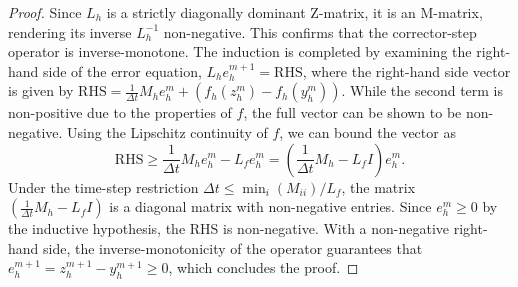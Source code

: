 \documentclass[pdflatex,sn-mathphys-num]{sn-jnl}%
\theoremstyle{thmstyleone}%
\numberwithin{equation}{section}
\begin{document}
\begin{proof}
Since $L_h$ is a strictly diagonally dominant Z-matrix, it is an M-matrix, rendering its inverse $L_h^{-1}$ non-negative. This confirms that the corrector-step operator is inverse-monotone. The induction is completed by examining the right-hand side of the error equation, $L_h e_h^{m+1} = \text{RHS}$, where the right-hand side vector is given by $\text{RHS} = \frac{1}{\Delta t} M_h e_h^m + (f_h(z_h^m) - f_h(y_h^m))$. While the second term is non-positive due to the properties of $f$, the full vector can be shown to be non-negative. Using the Lipschitz continuity of $f$, we can bound the vector as
$$ \text{RHS} \ge \frac{1}{\Delta t} M_h e_h^m - L_f e_h^m = \left( \frac{1}{\Delta t} M_h - L_f I \right) e_h^m. $$
Under the time-step restriction $\Delta t \le \min_i(M_{ii})/L_f$, the matrix $(\frac{1}{\Delta t} M_h - L_f I)$ is a diagonal matrix with non-negative entries. Since $e_h^m \ge 0$ by the inductive hypothesis, the RHS is non-negative. With a non-negative right-hand side, the inverse-monotonicity of the operator guarantees that $e_h^{m+1} = z_h^{m+1} - y_h^{m+1} \ge 0$, which concludes the proof.
\end{proof}
\end{document}
